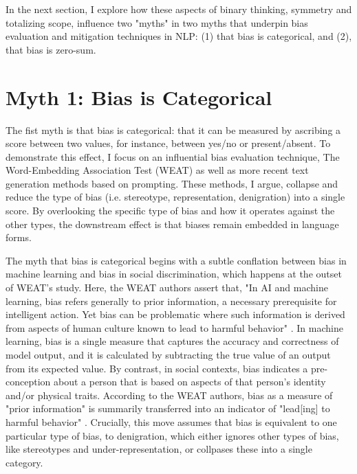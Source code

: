 \documentclass[11pt]{article}
\begin{document}
In the next section, I explore how these aspects of binary thinking,
symmetry and totalizing scope, influence two "myths" in two myths that
underpin bias evaluation and mitigation techniques in NLP: (1) that
bias is categorical, and (2), that bias is zero-sum.

\section{Myth 1: Bias is Categorical}

The fist myth is that bias is categorical: that it can be measured by
ascribing a score between two values, for instance, between yes/no or
present/absent. To demonstrate this effect, I focus on an influential
bias evaluation technique, The Word-Embedding Association Test (WEAT)
\citep{caliskan:2017} as well as more recent text generation methods
based on prompting. These methods, I argue, collapse and reduce the
type of bias (i.e. stereotype, representation, denigration) into a
single score. By overlooking the specific type of bias and how it
operates against the other types, the downstream effect is that biases
remain embedded in language forms.

The myth that bias is categorical begins with a subtle conflation
between bias in machine learning and bias in social discrimination,
which happens at the outset of WEAT's study. Here, the WEAT authors
assert that, "In AI and machine learning, bias refers generally to
prior information, a necessary prerequisite for intelligent action.
Yet bias can be problematic where such information is derived from
aspects of human culture known to lead to harmful
behavior" \citep{caliskan:2017}. In machine learning, bias is a single
measure that captures the accuracy and correctness of model output,
and it is calculated by subtracting the true value of an output from
its expected value. By contrast, in social contexts, bias indicates a
pre-conception about a person that is based on aspects of that
person's identity and/or physical traits. According to the WEAT
authors, bias as a measure of "prior information" is summarily
transferred into an indicator of "lead[ing] to harmful behavior"
\citep{caliskan:2017}. Crucially, this move assumes that bias is
equivalent to one particular type of bias, to denigration, which
either ignores other types of bias, like stereotypes and
under-representation, or collpases these into a single category.
\end{document}
